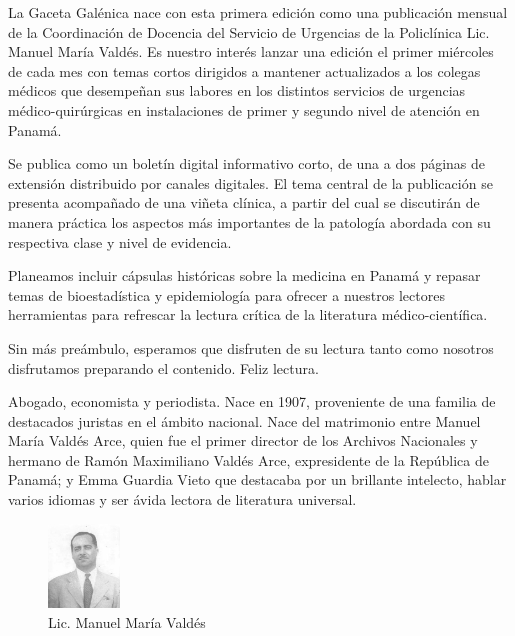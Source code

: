 \documentclass[a4paper]{article}
\date{\today}
\let\cite=\supercite
\begin{document}
\maketitle

\begin{multicols}{3}



La Gaceta Galénica nace con esta primera edición como una publicación mensual de
la Coordinación de Docencia del Servicio de Urgencias de la Policlínica Lic.
Manuel María Valdés. Es nuestro interés lanzar una edición el primer miércoles
de cada mes con temas cortos dirigidos a mantener actualizados a los colegas
médicos que desempeñan sus labores en los distintos servicios de urgencias
médico-quirúrgicas en instalaciones de primer y segundo nivel de atención en
Panamá.

Se publica como un boletín digital informativo corto, de una a dos páginas de
extensión distribuido por canales digitales. El tema central de la publicación
se presenta acompañado de una viñeta clínica, a partir del cual se discutirán
de manera práctica los aspectos más importantes de la patología abordada con su
respectiva clase y nivel de evidencia.

Planeamos incluir cápsulas históricas sobre la medicina en Panamá y repasar
temas de bioestadística y epidemiología para ofrecer a nuestros lectores
herramientas para refrescar la lectura crítica de la literatura
médico-científica.

Sin más preámbulo, esperamos que disfruten de su lectura tanto como nosotros
disfrutamos preparando el contenido. Feliz lectura.

\closearticle



Abogado, economista y periodista. Nace en 1907, proveniente de una familia de
destacados juristas en el ámbito nacional. Nace del matrimonio entre Manuel
María Valdés Arce, quien fue el primer director de los Archivos Nacionales y
hermano de Ramón Maximiliano Valdés Arce, expresidente de la República de
Panamá; y Emma Guardia Vieto que destacaba por un brillante intelecto, hablar
varios idiomas y ser ávida lectora de literatura universal\cite{panamerica10}.

\begin{figure}
	\begin{center}
		\vspace{-25pt}
		\includegraphics[width=0.17\textwidth]{mmvaldes.jpg}
	\end{center}
	\caption*{Lic. Manuel María Valdés}
\end{figure}


\end{multicols}
\end{document}
